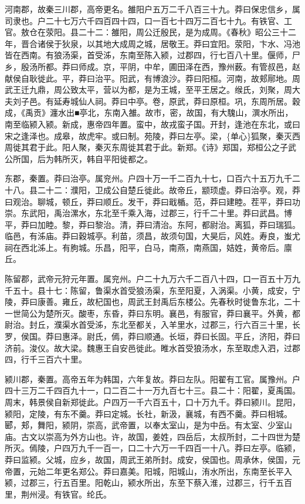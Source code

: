 \documentclass[]{article}
\begin{document}
河南郡，故秦三川郡，高帝更名。雒阳户五万二千八百三十九。莽曰保忠信乡，属司隶也。户二十七万六千四百四十四，口一百七十四万二百七十九。有铁官、工官。敖仓在荥阳。县二十二：雒阳，周公迁殷民，是为成周。《春秋》昭公三十二年，晋合诸侯于狄泉，以其地大成周之城，居敬王。莽曰宜阳。荥阳，卞水、冯池皆在西南。有狼汤渠，首受泲，东南至陈入颍，过郡四，行七百八十里。偃师，尸乡，殷汤所都。莽曰师成。京，平阴，中牟，圃田泽在西，豫州薮。有管叔邑，赵献侯自耿徙此。平，莽曰治平。阳武，有博浪沙。莽曰阳桓。河南，故郏鄏地。周武王迁九鼎，周公致太平，营以为都，是为王城，至平王居之。缑氏，刘聚，周大夫刘子邑。有延寿城仙人祠。莽曰中亭。卷，原武，莽曰原桓。巩，东周所居。穀成，《禹贡》瀍水出■亭北，东南入雒。故市，密，故国，有大騩山，潠水所出，南至临颍入颍。新成，惠帝四年置。蛮中，故戎蛮子国。开封，逢池在东北，或曰宋之逢泽也。成皋，故虎牢。或曰制。苑陵，莽曰左亭。梁，\{单心\}狐聚，秦灭西周徙其君于此。阳人聚，秦灭东周徙其君于此。新郑。《诗》郑国，郑桓公之子武公所国，后为韩所灭，韩自平阳徙都之。

东郡，秦置。莽曰治亭。属兖州。户四十万一千二百九十七，口百六十五万九千二十八。县二十二：濮阳，卫成公自楚丘徙此。故帝丘，颛顼虚。莽曰治亭。观，莽曰观治。聊城，顿丘，莽曰顺丘。发干，莽曰戢楯。范，莽曰建睦。茬平，莽曰功崇。东武阳，禹治漯水，东北至千乘入海，过郡三，行千二十里。莽曰武昌。博平，莽曰加睦。黎，莽曰黎治。清，莽曰清治。东阿，都尉治。离狐，莽曰瑞狐。临邑，有泲庙。莽曰穀城亭。利苗，须昌，故须句国，大昊后，风姓。寿良，蚩尤祠在西北泲上。有朐城。乐昌，阳平，白马，南燕，南燕国，姞姓，黄帝后。廪丘。

陈留郡，武帝元狩元年置。属兖州。户二十九万六千二百八十四，口一百五十万九千五十。县十七：陈留，鲁渠水首受狼汤渠，东至阳夏，入涡渠。小黄，成安，宁陵，莽曰康善。雍丘，故杞国也，周武王封禹后东楼公。先春秋时徙鲁东北，二十一世简公为楚所灭。酸枣，东昏，莽曰东明。襄邑，有服官，莽曰襄平。外黄，都尉治。封丘，濮渠水首受泲，东北至都关，入羊里水，过郡三，行六百三十里，长罗，侯国。莽曰惠泽。尉氏，傿，莽曰顺通。长垣，莽曰长固。平丘，济阳，莽曰济前。浚仪。故大梁。魏惠王自安邑徙此。睢水首受狼汤水，东至取虑入泗，过郡四，行千三百六十里。

颍川郡，秦置。高帝五年为韩国，六年复故。莽曰左队。阳翟有工官。属豫州。户四十三万二千四百九十一，口二百二十一万九百七十三。县二十：阳翟，夏禹国。周末，韩景侯自新郑徙此。户四万一千六百五十，口十万九千。莽曰颍川。昆阳，颍阳，定陵，有东不羹。莽曰定城。长社，新汲，襄城，有西不羹。莽曰相城。郾，郏，舞阳，颍阴，崇高，武帝置，以奉太室山，是为中岳。有太室、少室山庙。古文以崇高为外方山也。许，故国，姜姓，四岳后，太叔所封，二十四世为楚所灭。傿陵，户四万九千一百一，口二十六万一千四百一十八。莽曰左亭。临颍，莽曰监颍。父城，应乡，故国，周武王弟所封。成安，侯国也。周承休，侯国，元帝置，元始二年更名郑公。莽曰嘉美。阳城，阳城山，洧水所出，东南至长平入颍，过郡三，行五百里。阳乾山，颍水所出，东至下蔡入淮，过郡三，行千五百里，荆州浸。有铁官。纶氏。
\end{document}
